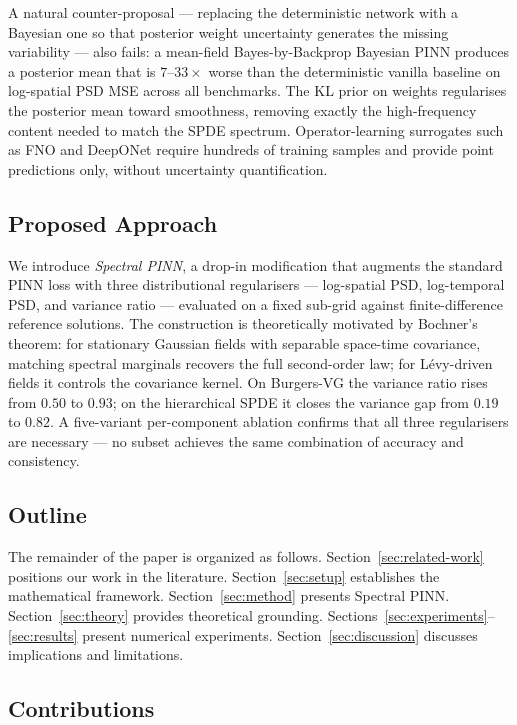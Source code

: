 \documentclass[times,12pt]{elsarticle}
\begin{document}
A natural counter-proposal --- replacing the deterministic network with a
Bayesian one so that posterior weight uncertainty generates the missing
variability --- also fails: a mean-field Bayes-by-Backprop Bayesian PINN
\cite{YangMengKarniadakis2021} produces a posterior mean that is
$7$--$33\times$ worse than the deterministic vanilla baseline on log-spatial
PSD MSE across all benchmarks. The KL prior on weights regularises the
posterior mean toward smoothness, removing exactly the high-frequency content
needed to match the SPDE spectrum. Operator-learning surrogates such as FNO
and DeepONet require hundreds of training samples and provide point
predictions only, without uncertainty quantification.

\subsection{Proposed Approach}

We introduce \emph{Spectral PINN}, a drop-in modification that augments the
standard PINN loss with three distributional regularisers --- log-spatial PSD,
log-temporal PSD, and variance ratio --- evaluated on a fixed sub-grid against
finite-difference reference solutions. The construction is theoretically
motivated by Bochner's theorem: for stationary Gaussian fields with separable
space-time covariance, matching spectral marginals recovers the full
second-order law; for L\'evy-driven fields it controls the covariance kernel.
On Burgers-VG the variance ratio rises from $0.50$ to $0.93$; on the
hierarchical SPDE it closes the variance gap from $0.19$ to $0.82$.
A five-variant per-component ablation confirms that all three regularisers
are necessary --- no subset achieves the same combination of accuracy and
consistency.

\subsection{Outline}

The remainder of the paper is organized as follows. Section~\ref{sec:related-work}
positions our work in the literature. Section~\ref{sec:setup} establishes the
mathematical framework. Section~\ref{sec:method} presents Spectral PINN.
Section~\ref{sec:theory} provides theoretical grounding.
Sections~\ref{sec:experiments}--\ref{sec:results} present numerical experiments.
Section~\ref{sec:discussion} discusses implications and limitations.
\subsection{Contributions}
\label{sec:contributions}
\end{document}
